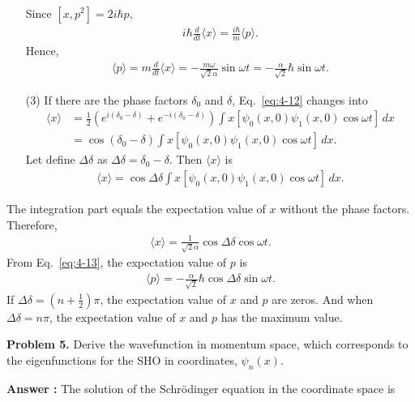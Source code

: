 \documentclass[floatfix,nofootinbib,superscriptaddress,fleqn]{revtex4-2}
\begin{document}
\begin{itemize}
\begin{align}
  \end{align}
  Since $\left[x,p^2\right]=2i\hbar p$,
  \begin{align}
    i\hbar\frac{d}{dt}\langle x \rangle
    =\frac{i\hbar}{m}\langle
     p\rangle.
  \end{align}
  Hence,
  \begin{align}\label{eq:4-13}
    \langle p\rangle
    =m\frac{d}{dt}\langle x \rangle
    =-\frac{m\omega}{\sqrt{2}\alpha}\sin{\omega t}
    =-\frac{\alpha}{\sqrt{2}}\hbar\sin{\omega t}.
  \end{align}
  \item[(3)] 
  If there are the phase factors $\delta_0$ and $\delta$,
  Eq.~\eqref{eq:4-12} changes into
  \begin{align}
      \langle x \rangle&=\frac{1}{2}
      \left(e^{i(\delta_0-\delta)}+e^{-i(\delta_0-\delta)}\right)
      \int x\left[\psi_0(x,0)\psi_1(x,0)\cos{\omega t}\right]\,dx  \\
      &=\cos{(\delta_0-\delta)}
      \int x\left[\psi_0(x,0)\psi_1(x,0)\cos{\omega t}\right]\,dx.
  \end{align}
  Let define $\Delta\delta$ as $\Delta\delta=\delta_0-\delta$. Then 
  $\langle x \rangle$ is
  \begin{align}
    \langle x \rangle=\cos{\Delta\delta}
    \int x\left[\psi_0(x,0)\psi_1(x,0)\cos{\omega t}\right]\,dx.
  \end{align}
\end{itemize}
The integration part equals the expectation value of $x$ 
without the phase factors. Therefore,
\begin{align}
  \langle x \rangle=
  \frac{1}{\sqrt{2}\alpha}\cos{\Delta\delta}\cos{\omega t}.
\end{align}
From Eq.~\eqref{eq:4-13}, the expectation value of $p$ is
\begin{align}
  \langle p \rangle=
  -\frac{\alpha}{\sqrt{2}}\hbar\cos{\Delta\delta}\sin{\omega t}.
\end{align}
If $\Delta\delta=\left(n+\frac{1}{2}\right)\pi$, the expectation value of 
$x$ and $p$ are zeros. And when $\Delta\delta=n\pi$,  the expectation value of 
$x$ and $p$ has the maximum value.
 \vspace{1cm}

\noindent \textbf{Problem 5.}
Derive the wavefunction in momentum space, which corresponds to the
eigenfunctions for the SHO in coordinates, $\psi_n(x)$. 

\noindent \textbf{Answer : }
The solution of the Schr\"odinger equation in the 
coordinate space is
\end{document}
